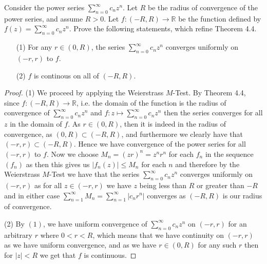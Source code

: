 \documentclass[oneside]{amsart}
\theoremstyle{definition}
\newcommand{\rr}{\mathbb R}
\begin{document}
\begin{tcolorbox}[colback=black!5!white,colframe=black!75!black,title= Exercise $4.3.$] Consider the power series $ \sum_{n=0}^\infty c_n z^n$. Let $R$ be the radius of convergence of the power series, and assume $R>0$. Let $f \colon (-R, R) \to \rr$ be the function defined by $f(z) = \sum_{n=0}^\infty c_n z^n$. Prove the following statements, which refine Theorem 4.4.
\begin{itemize}
	\item [(1)] For any $r \in (0, R)$, the series $\sum_{n=0}^\infty c_n z^n$ converges uniformly on $(-r, r)$ to $f$.
	\item [(2)] $f$ is continous on all of $(-R, R)$.
\end{itemize}
\tcblower 
\begin{proof} (1) We proceed by applying the Weierstrass $M$-Test. By Theorem 4.4, since $f \colon (-R, R) \to \rr$, i.e. the domain of the function is the radius of convergence of  $\sum_{n=0}^\infty c_n z^n$ and $f \colon z \mapsto \sum_{n=0}^\infty c_n z^n$ then the series converges for all $z$ in the domain of $f$. As $r \in (0,R)$, then it is indeed in the radius of convergence, as $(0, R) \subset (-R, R)$, and furthermore we clearly have that $(-r, r) \subset (-R, R)$. Hence we have convergence of the power series for all $(-r,r)$ to $f$. Now we choose $M_n = (zr)^n= z^n r^n$ for each $f_n$ in the sequence $(f_n)$ as then this gives us $|f_n(z)| \leq M_n$ for each $n$ and therefore by the Weierstrass $M$-Test we have that the series $\sum_{n=0}^\infty c_n z^n$ converges uniformly on $(-r,r)$ as for all $z \in (-r,r)$ we have $z$ being less than $R$ or greater than $-R$ and in either case $\sum_{n=1}^\infty M_n = \sum_{n=1}^\infty |c_nr^n|$ converges as $(-R, R)$ is our radius of convergence.


(2) By $(1)$, we have uniform convergence of $\sum_{n=0}^\infty c_n z^n$ on $(-r, r)$ for an arbitrary $r$ where $0 < r<R$, which means that we have continuity on $(-r,r)$ as we have uniform convergence, and as we have $r \in (0, R)$ for any such $r$ then for $|z|<R$ we get that $f$ is continuous. \end{proof} 

\end{tcolorbox}
\end{document}
